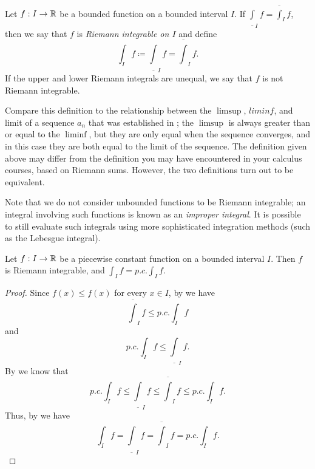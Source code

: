 \begin{defn}\label{i:11.3.4}
  Let \(f : I \to \mathbb{R}\) be a bounded function on a bounded interval \(I\).
  If \(\underline{\int}_I f = \overline{\int}_I f\), then we say that \(f\) is \emph{Riemann integrable on \(I\)} and define
  \[
    \int_I f \coloneqq \underline{\int}_I f = \overline{\int}_I f.
  \]
  If the upper and lower Riemann integrals are unequal, we say that \(f\) is not Riemann integrable.
\end{defn}

\begin{rmk}\label{i:11.3.5}
  Compare this definition to the relationship between the \(\limsup\), \(liminf\), and limit of a sequence \(a_n\) that was established in ;
  the \(\limsup\) is always greater than or equal to the \(\liminf\), but they are only equal when the sequence converges, and in this case they are both equal to the limit of the sequence.
  The definition given above may differ from the definition you may have encountered in your calculus courses, based on Riemann sums.
  However, the two definitions turn out to be equivalent.
\end{rmk}

\begin{rmk}\label{i:11.3.6}
  Note that we do not consider unbounded functions to be Riemann integrable;
  an integral involving such functions is known as an \emph{improper integral}.
  It is possible to still evaluate such integrals using more sophisticated integration methods (such as the Lebesgue integral).
\end{rmk}

\begin{lem}\label{i:11.3.7}
  Let \(f : I \to \mathbb{R}\) be a piecewise constant function on a bounded interval \(I\).
  Then \(f\) is Riemann integrable, and \(\int_I f = p.c. \int_I f\).
\end{lem}

\begin{proof}
  Since \(f(x) \leq f(x)\) for every \(x \in I\), by  we have
  \[
    \overline{\int}_I f \leq p.c. \int_I f
  \]
  and
  \[
    p.c. \int_I f \leq \underline{\int}_I f.
  \]
  By  we know that
  \[
    p.c. \int_I f \leq \underline{\int}_I f \leq \overline{\int}_I f \leq p.c. \int_I f.
  \]
  Thus, by  we have
  \[
    \int_I f = \underline{\int}_I f = \overline{\int}_I f = p.c. \int_I f.
  \]
\end{proof}

